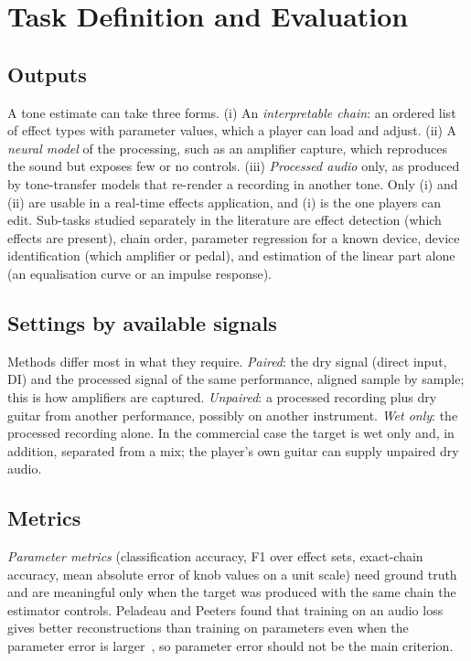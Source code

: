 \section{Task Definition and Evaluation}
\label{sec:task}

\subsection{Outputs}

A tone estimate can take three forms. (i) An \emph{interpretable chain}: an
ordered list of effect types with parameter values, which a player can load
and adjust. (ii) A \emph{neural model} of the processing, such as an
amplifier capture, which reproduces the sound but exposes few or no
controls. (iii) \emph{Processed audio} only, as produced by tone-transfer
models that re-render a recording in another tone. Only (i) and (ii) are
usable in a real-time effects application, and (i) is the one players can
edit. Sub-tasks studied separately in the literature are effect detection
(which effects are present), chain order, parameter regression for a known
device, device identification (which amplifier or pedal), and estimation of
the linear part alone (an equalisation curve or an impulse response).

\subsection{Settings by available signals}

Methods differ most in what they require. \emph{Paired}: the dry signal
(direct input, DI) and the processed signal of the same performance, aligned
sample by sample; this is how amplifiers are captured. \emph{Unpaired}: a
processed recording plus dry guitar from another performance, possibly on
another instrument. \emph{Wet only}: the processed recording alone. In the
commercial case the target is wet only and, in addition, separated from a mix;
the player's own guitar can supply unpaired dry audio.

\subsection{Metrics}

\emph{Parameter metrics} (classification accuracy, F1 over effect sets,
exact-chain accuracy, mean absolute error of knob values on a unit scale) need
ground truth and are meaningful only when the target was produced with the
same chain the estimator controls. Peladeau and Peeters found that training on
an audio loss gives better reconstructions than training on parameters even
when the parameter error is larger~\cite{peladeau2024blind}, so parameter error
should not be the main criterion.

